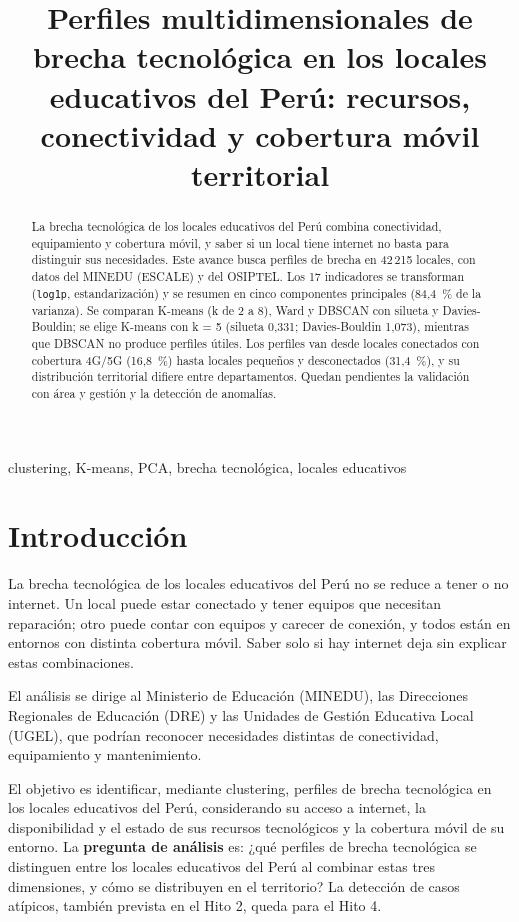 \documentclass[conference]{IEEEtran}
\title{Perfiles multidimensionales de brecha tecnológica en los locales educativos del Perú: recursos, conectividad y cobertura móvil territorial}
\author{
\IEEEauthorblockN{Francisco Luis Delgado Santana, Nicole Rashel Pando Cabezas, Brayan Anderson Rua Pomahuacre}
\IEEEauthorblockA{Grupo: Mineros \\
Curso: Data Mining \\
Universidad del Pacífico \\
Docente: Soledad Espezúa Llerena}
}
\begin{document}
\maketitle

\begin{abstract}
La brecha tecnológica de los locales educativos del Perú combina conectividad, equipamiento y cobertura móvil, y saber si un local tiene internet no basta para distinguir sus necesidades. Este avance busca perfiles de brecha en 42\,215 locales, con datos del MINEDU (ESCALE) y del OSIPTEL. Los 17 indicadores se transforman (\texttt{log1p}, estandarización) y se resumen en cinco componentes principales (84,4~\% de la varianza). Se comparan K-means (k de 2 a 8), Ward y DBSCAN con silueta y Davies-Bouldin; se elige K-means con k = 5 (silueta 0,331; Davies-Bouldin 1,073), mientras que DBSCAN no produce perfiles útiles. Los perfiles van desde locales conectados con cobertura 4G/5G (16,8~\%) hasta locales pequeños y desconectados (31,4~\%), y su distribución territorial difiere entre departamentos. Quedan pendientes la validación con área y gestión y la detección de anomalías.
\end{abstract}

\begin{IEEEkeywords}
clustering, K-means, PCA, brecha tecnológica, locales educativos
\end{IEEEkeywords}

\section{Introducción}
La brecha tecnológica de los locales educativos del Perú no se reduce a tener o no internet. Un local puede estar conectado y tener equipos que necesitan reparación; otro puede contar con equipos y carecer de conexión, y todos están en entornos con distinta cobertura móvil. Saber solo si hay internet deja sin explicar estas combinaciones.

El análisis se dirige al Ministerio de Educación (MINEDU), las Direcciones Regionales de Educación (DRE) y las Unidades de Gestión Educativa Local (UGEL), que podrían reconocer necesidades distintas de conectividad, equipamiento y mantenimiento.

El objetivo es identificar, mediante clustering, perfiles de brecha tecnológica en los locales educativos del Perú, considerando su acceso a internet, la disponibilidad y el estado de sus recursos tecnológicos y la cobertura móvil de su entorno. La \textbf{pregunta de análisis} es: ¿qué perfiles de brecha tecnológica se distinguen entre los locales educativos del Perú al combinar estas tres dimensiones, y cómo se distribuyen en el territorio? La detección de casos atípicos, también prevista en el Hito 2, queda para el Hito 4.
\end{document}
